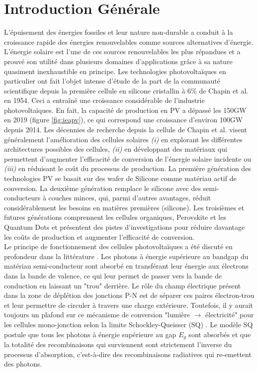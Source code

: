 \chapter*{Introduction Générale}
\label{sec:intro}
L’épuisement des énergies fossiles et leur nature non-durable a conduit à la croissance rapide des énergies renouvelables comme sources alternatives d'énergie. L’énergie solaire est l’une de ces sources renouvelables les plus répandues et a prouvé son utilité dans plusieurs domaines d'applications grâce à sa nature quasiment inexhaustible en principe. Les technologies photovoltaïques en particulier ont fait l'objet intense d'étude de la part de la communauté scientifique depuis la première cellule en silicone cristallin à 6\% de Chapin et al. \cite{Chapin1954} en 1954. Ceci a entraîné une croissance considérable de l'industrie photovoltaïques. En fait, la capacité de production en PV a dépassé les 150GW \cite{iea2020} en 2019 (figure \ref{fig:ieapv}), ce qui correspond une croissance d'environ 100GW depuis 2014. Les décennies de recherche depuis la cellule de Chapin et al. visent généralement l'amélioration des cellules solaires \textit{(i)} en explorant les différentes architectures possibles des cellules, \textit{(ii)} en développant des matériaux qui permettent d'augmenter l'efficacité de conversion de l'énergie solaire incidente ou \textit{(iii)} en réduisant le coût du processus de production. La première génération des technologies PV se basait sur des wafer de Silicone comme matériau actif de conversion. La deuxième génération remplace le silicone avec des semi-conducteurs à couches minces, qui, parmi d'autres avantages, réduit considérablement les besoins en matières premières (silicone). Les troisièmes et futures générations comprennent les cellules organiques, Perovskite et les Quantum Dots et présentent des pistes d'investigations pour réduire davantage les coûts de production et augmenter l'efficacité de conversion.\\
Le principe de fonctionnement des cellules photovoltaïques a été discuté en profondeur dans la littérature \cite{Fraas2010,  Sze2006, Wenham2013}.
Les photons à énergie supérieure au bandgap du matériau semi-conducteur sont absorbé en transférant leur énergie aux électrons dans la bande de valence, ce qui leur permet de passer vers la bande de conduction en laissant un "trou" derrière. Le rôle du champ électrique présent dans la zone de déplétion des jonctions P-N est de séparer ces paires électron-trou et leur permettre de circuler à travers une charge extérieure. Toutefois, il y aurait toujours un plafond sur ce mécanisme de conversion "lumière $\rightarrow$ électricité" pour les cellules mono-jonction selon la limite Schockley-Queisser (SQ) \cite{Shockley1961}. Le modèle SQ postule que tous les photons à énergie supérieure au gap $E_g$ sont absorbés et que la totalité des recombinaisons qui surviennent sont strictement l'inverse du processus d'absorption, c'est-à-dire des recombinaisons radiatives qui re-emettent des photons.\\
